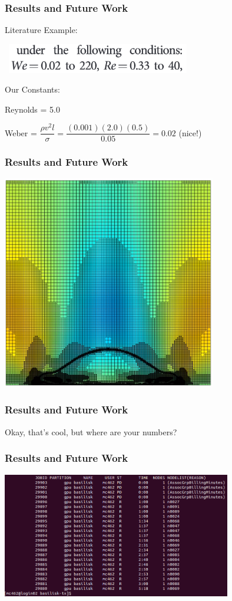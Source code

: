 \documentclass[12pt]{beamer}
\begin{document}
\begin{frame}
    \frametitle{Results and Future Work}
    Literature Example:

    \
    \includegraphics[width=0.6\textwidth]{img/wang-constants.png}

    Our Constants:

    Reynolds = 5.0

    Weber = $\dfrac{\rho v^2 l}{\sigma} 
    = \dfrac{(0.001)(2.0)(0.5)}{0.05}
    = 0.02$ (nice!)
\end{frame}
\begin{frame}
    \frametitle{Results and Future Work}
    \includegraphics[width=0.7\textwidth]{img/7-current.png}
\end{frame}
\begin{frame}
    \frametitle{Results and Future Work}
    Okay, that's cool, but where are your numbers?
\end{frame}
\begin{frame}
    \frametitle{Results and Future Work}
    \includegraphics[width=0.75\textwidth]{img/8-slurm.png}
\end{frame}
\end{document}
